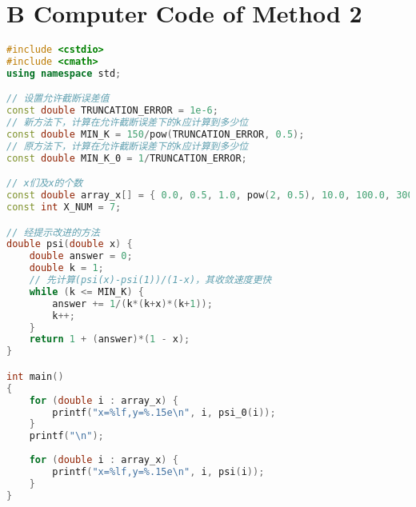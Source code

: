 \documentclass[UTF8]{article}
\begin{document}
\section*{B Computer Code of Method 2}
\begin{lstlisting}[language=C++]
#include <cstdio>
#include <cmath>
using namespace std;

// 设置允许截断误差值
const double TRUNCATION_ERROR = 1e-6;
// 新方法下，计算在允许截断误差下的k应计算到多少位
const double MIN_K = 150/pow(TRUNCATION_ERROR, 0.5);
// 原方法下，计算在允许截断误差下的k应计算到多少位
const double MIN_K_0 = 1/TRUNCATION_ERROR;

// x们及x的个数
const double array_x[] = { 0.0, 0.5, 1.0, pow(2, 0.5), 10.0, 100.0, 300.0 };
const int X_NUM = 7;

// 经提示改进的方法
double psi(double x) {
	double answer = 0;
	double k = 1;
	// 先计算(psi(x)-psi(1))/(1-x)，其收敛速度更快
	while (k <= MIN_K) {
		answer += 1/(k*(k+x)*(k+1));
		k++;
	}
	return 1 + (answer)*(1 - x);
}

int main()
{
	for (double i : array_x) {
		printf("x=%lf,y=%.15e\n", i, psi_0(i));
	}
	printf("\n");
	
	for (double i : array_x) {
		printf("x=%lf,y=%.15e\n", i, psi(i));
	}
}

\end{lstlisting}
\end{document}
